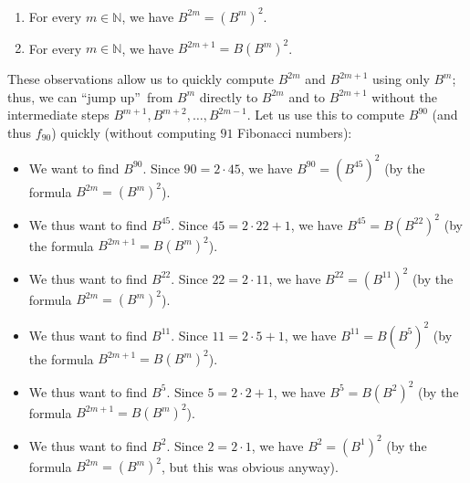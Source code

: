 \documentclass[numbers=enddot,12pt,final,onecolumn,notitlepage]{scrartcl}%
\theoremstyle{definition}
\begin{document}
\begin{enumerate}
\item For every $m\in\mathbb{N}$, we have $B^{2m}=\left(  B^{m}\right)  ^{2}$.

\item For every $m\in\mathbb{N}$, we have $B^{2m+1}=B\left(  B^{m}\right)
^{2}$.
\end{enumerate}

These observations allow us to quickly compute $B^{2m}$ and $B^{2m+1}$ using
only $B^{m}$; thus, we can \textquotedblleft jump up\textquotedblright\ from
$B^{m}$ directly to $B^{2m}$ and to $B^{2m+1}$ without the intermediate steps
$B^{m+1},B^{m+2},\ldots,B^{2m-1}$. Let us use this to compute $B^{90}$ (and
thus $f_{90}$) quickly (without computing $91$ Fibonacci numbers):

\begin{itemize}
\item We want to find $B^{90}$. Since $90=2\cdot45$, we have $B^{90}=\left(
B^{45}\right)  ^{2}$ (by the formula $B^{2m}=\left(  B^{m}\right)  ^{2}$).

\item We thus want to find $B^{45}$. Since $45=2\cdot22+1$, we have
$B^{45}=B\left(  B^{22}\right)  ^{2}$ (by the formula $B^{2m+1}=B\left(
B^{m}\right)  ^{2}$).

\item We thus want to find $B^{22}$. Since $22=2\cdot11$, we have
$B^{22}=\left(  B^{11}\right)  ^{2}$ (by the formula $B^{2m}=\left(
B^{m}\right)  ^{2}$).

\item We thus want to find $B^{11}$. Since $11=2\cdot5+1$, we have
$B^{11}=B\left(  B^{5}\right)  ^{2}$ (by the formula $B^{2m+1}=B\left(
B^{m}\right)  ^{2}$).

\item We thus want to find $B^{5}$. Since $5=2\cdot2+1$, we have
$B^{5}=B\left(  B^{2}\right)  ^{2}$ (by the formula $B^{2m+1}=B\left(
B^{m}\right)  ^{2}$).

\item We thus want to find $B^{2}$. Since $2=2\cdot1$, we have $B^{2}=\left(
B^{1}\right)  ^{2}$ (by the formula $B^{2m}=\left(  B^{m}\right)  ^{2}$, but
this was obvious anyway).
\end{itemize}
\end{document}
